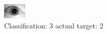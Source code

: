 \begin{figure}[h!]
\begin{center}
\includegraphics[width=0.60\columnwidth]{figures/ID1721_class_3_target_2.png}
\end{center}
\caption{ Classification: 3 actual target: 2}
\label{fig:ID1721_class_3_target_2}
\end{figure}
